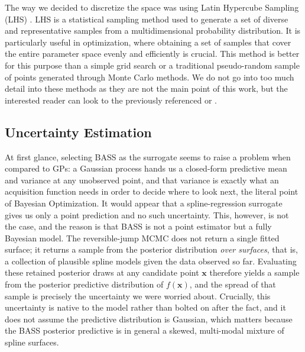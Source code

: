The way we decided to discretize the space was using Latin Hypercube Sampling (LHS) \cite{mckay2000comparison}. LHS is a statistical sampling method used to generate a set of diverse and representative samples from a multidimensional probability distribution. It is particularly useful in optimization, where obtaining a set of samples that cover the entire parameter space evenly and efficiently is crucial. This method is better for this purpose than a simple grid search or a traditional pseudo-random sample of points generated through Monte Carlo methods.  We do not go into too much detail into these methods as they are not the main point of this work, but the interested reader can look to the previously referenced \cite{mckay2000comparison} or \cite{stein1987large}. 

\subsection{Uncertainty Estimation}

At first glance, selecting BASS as the surrogate seems to raise a problem when compared to GPs: a Gaussian process hands us a closed-form predictive mean and variance at any unobserved point, and that variance is exactly what an acquisition function needs in order to decide where to look next, the literal point of Bayesian Optimization. It would appear that a spline-regression surrogate gives us only a point prediction and no such uncertainty. This, however, is not the case, and the reason is that BASS is not a point estimator but a fully Bayesian model. The reversible-jump MCMC does not return a single fitted surface; it returns a sample from the posterior distribution \emph{over surfaces}, that is, a collection of plausible spline models given the data observed so far. Evaluating these retained posterior draws at any candidate point $\boldsymbol{x}$ therefore yields a sample from the posterior predictive distribution of $f(\boldsymbol{x})$, and the spread of that sample is precisely the uncertainty we were worried about. Crucially, this uncertainty is native to the model rather than bolted on after the fact, and it does not assume the predictive distribution is Gaussian, which matters because the BASS posterior predictive is in general a skewed, multi-modal mixture of spline surfaces.

